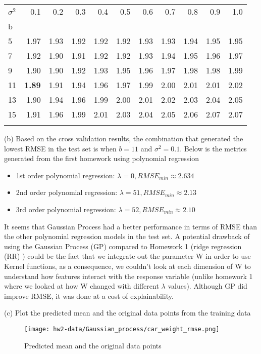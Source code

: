 \documentclass[11pt]{report}
\begin{document}
\begin{center}
\begin{tabular}{lrrrrrrrrrr}
\toprule
\;\;\;  $\sigma^2$ &   0.1 &   0.2 &   0.3 &   0.4 &   0.5 &   0.6 &   0.7 &   0.8 &   0.9 &   1.0 \\
b  &       &       &       &       &       &       &       &       &       &       \\
\midrule
5  &  1.97 &  1.93 &  1.92 &  1.92 &  1.92 &  1.93 &  1.93 &  1.94 &  1.95 &  1.95 \\
7  &  1.92 &  1.90 &  1.91 &  1.92 &  1.92 &  1.93 &  1.94 &  1.95 &  1.96 &  1.97 \\
9  &  1.90 &  1.90 &  1.92 &  1.93 &  1.95 &  1.96 &  1.97 &  1.98 &  1.98 &  1.99 \\
11 &  \textbf{1.89} &  1.91 &  1.94 &  1.96 &  1.97 &  1.99 &  2.00 &  2.01 &  2.01 &  2.02 \\
13 &  1.90 &  1.94 &  1.96 &  1.99 &  2.00 &  2.01 &  2.02 &  2.03 &  2.04 &  2.05 \\
15 &  1.91 &  1.96 &  1.99 &  2.01 &  2.03 &  2.04 &  2.05 &  2.06 &  2.07 &  2.07 \\
\bottomrule
\label{table:rmse_table}
\end{tabular}
\end{center}

\justify (b) Based on the cross validation results, the combination that generated the lowest RMSE in the test set is when $b=11$ and $\sigma^2=0.1$. Below is the metrics generated from the first homework using polynomial regression
\begin{itemize}
	\item 1st order polynomial regression: $\lambda = 0, RMSE_{min} \approx 2.634$
	\item 2nd order polynomial regression: $\lambda = 51, RMSE_{min} \approx 2.13$
	\item 3rd order polynomial regression: $\lambda = 52, RMSE_{min} \approx 2.10$
\end{itemize} 

\justify It seems that Gaussian Process had a better performance in terms of RMSE than the other polynomial regression models in the test set. A potential drawback of using the Gaussian Process (GP) compared to Homework 1 (ridge regression (RR) ) could be the fact that we integrate out the parameter W in order to use Kernel functions, as a consequence,  we couldn't look at each dimension of W to understand how features interact with the response variable (unlike homework 1 where we looked at how W changed with different $\lambda$ values). Although GP did improve RMSE, it was done at a cost of explainability. 

\pagebreak
\justify (c) Plot the predicted mean and the original data points from the training data
\begin{figure}[h]
\texttt{[image: hw2-data/Gaussian\_process/car\_weight\_rmse.png]}
\centering
\caption{Predicted mean and the original data points}
\label{fig:car_weight_rmse}
\end{figure}
\end{document}
